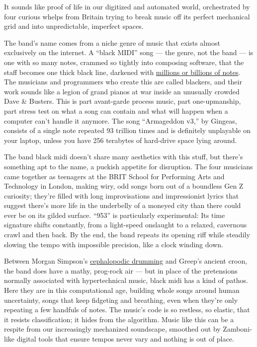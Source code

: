 It sounds like proof of life in our digitized and automated world,
orchestrated by four curious whelps from Britain trying to break music
off its perfect mechanical grid and into unpredictable, imperfect
spaces.

The band's name comes from a niche genre of music that exists almost
exclusively on the internet. A ``black MIDI'' song --- the genre, not
the band --- is one with so many notes, crammed so tightly into
composing software, that the staff becomes one thick black line,
darkened with
\href{https://www.youtube.com/watch?v=mUy8vnZLwhk}{millions or billions
of notes}. The musicians and programmers who create this are called
blackers, and their work sounds like a legion of grand pianos at war
inside an unusually crowded Dave \& Busters. This is part avant-garde
process music, part one-upmanship, part stress test on what a song can
contain and what will happen when a computer can't handle it anymore.
The song ``Armageddon v3,'' by Gingeas, consists of a single note
repeated 93 trillion times and is definitely unplayable on your laptop,
unless you have 256 terabytes of hard-drive space lying around.

The band black midi doesn't share many aesthetics with this stuff, but
there's something apt to the name, a puckish appetite for disruption.
The four musicians came together as teenagers at the BRIT School for
Performing Arts and Technology in London, making wiry, odd songs born
out of a boundless Gen Z curiosity; they're filled with long
improvisations and impressionist lyrics that suggest there's more life
in the underbelly of a moneyed city than there could ever be on its
gilded surface. ``953'' is particularly experimental: Its time signature
shifts constantly, from a light-speed onslaught to a relaxed, cavernous
crawl and then back. By the end, the band repeats its opening riff while
steadily slowing the tempo with impossible precision, like a clock
winding down.

Between Morgan Simpson's
\href{https://www.youtube.com/watch?v=TMn1UuEIVvA}{cephalopodic
drumming} and Greep's ancient croon, the band does have a mathy,
prog-rock air --- but in place of the pretensions normally associated
with hyper­technical music, black midi has a kind of pathos. Here they
are in this computational age, building whole songs around human
uncertainty, songs that keep fidgeting and breathing, even when they're
only repeating a few handfuls of notes. The music's code is so restless,
so elastic, that it resists classification; it hides from the algorithm.
Music like this can be a respite from our increasingly mechanized
soundscape, smoothed out by Zamboni­like digital tools that ensure
tempos never vary and nothing is out of place.

